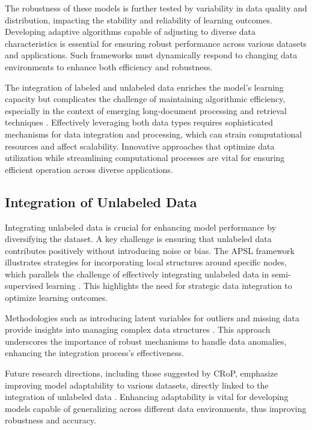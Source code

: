 The robustness of these models is further tested by variability in data quality and distribution, impacting the stability and reliability of learning outcomes. Developing adaptive algorithms capable of adjusting to diverse data characteristics is essential for ensuring robust performance across various datasets and applications. Such frameworks must dynamically respond to changing data environments to enhance both efficiency and robustness.

The integration of labeled and unlabeled data enriches the model's learning capacity but complicates the challenge of maintaining algorithmic efficiency, especially in the context of emerging long-document processing and retrieval techniques \cite{ginzburg2021selfsuperviseddocumentsimilarityranking}. Effectively leveraging both data types requires sophisticated mechanisms for data integration and processing, which can strain computational resources and affect scalability. Innovative approaches that optimize data utilization while streamlining computational processes are vital for ensuring efficient operation across diverse applications.

\subsection{Integration of Unlabeled Data} \label{subsec:Integration of Unlabeled Data}

Integrating unlabeled data is crucial for enhancing model performance by diversifying the dataset. A key challenge is ensuring that unlabeled data contributes positively without introducing noise or bias. The APSL framework illustrates strategies for incorporating local structures around specific nodes, which parallels the challenge of effectively integrating unlabeled data in semi-supervised learning \cite{ling2021bayesiannetworkstructurelearning}. This highlights the need for strategic data integration to optimize learning outcomes.

Methodologies such as introducing latent variables for outliers and missing data provide insights into managing complex data structures \cite{revillon2017variationalbayesianinferencescale}. This approach underscores the importance of robust mechanisms to handle data anomalies, enhancing the integration process's effectiveness.

Future research directions, including those suggested by CRoP, emphasize improving model adaptability to various datasets, directly linked to the integration of unlabeled data \cite{kaur2024cropcontextwiserobuststatic}. Enhancing adaptability is vital for developing models capable of generalizing across different data environments, thus improving robustness and accuracy.

